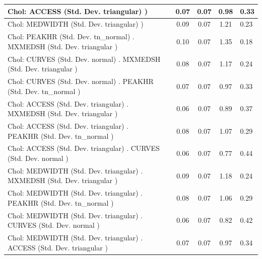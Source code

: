 \begin{table}
\begin{center}
\begin{tabular}{|l|l|c|c|c|l|}
			\hline
			 Chol: ACCESS (Std. Dev. triangular) ) &  & 0.07 & 0.07 & 0.98 & 0.33 \\
			\hline
			 Chol: MEDWIDTH (Std. Dev. triangular) ) &  & 0.09 & 0.07 & 1.21 & 0.23 \\
			\hline
			 Chol: PEAKHR (Std. Dev. tn_normal) . MXMEDSH (Std. Dev.   triangular ) &  & 0.10 & 0.07 & 1.35 & 0.18 \\
			\hline
			 Chol: CURVES (Std. Dev. normal) . MXMEDSH (Std. Dev.   triangular ) &  & 0.08 & 0.07 & 1.17 & 0.24 \\
			\hline
			 Chol: CURVES (Std. Dev. normal) . PEAKHR (Std. Dev.   tn_normal ) &  & 0.07 & 0.07 & 0.97 & 0.33 \\
			\hline
			 Chol: ACCESS (Std. Dev. triangular) . MXMEDSH (Std. Dev.   triangular ) &  & 0.06 & 0.07 & 0.89 & 0.37 \\
			\hline
			 Chol: ACCESS (Std. Dev. triangular) . PEAKHR (Std. Dev.   tn_normal ) &  & 0.08 & 0.07 & 1.07 & 0.29 \\
			\hline
			 Chol: ACCESS (Std. Dev. triangular) . CURVES (Std. Dev.   normal ) &  & 0.06 & 0.07 & 0.77 & 0.44 \\
			\hline
			 Chol: MEDWIDTH (Std. Dev. triangular) . MXMEDSH (Std. Dev.   triangular ) &  & 0.09 & 0.07 & 1.18 & 0.24 \\
			\hline
			 Chol: MEDWIDTH (Std. Dev. triangular) . PEAKHR (Std. Dev.   tn_normal ) &  & 0.08 & 0.07 & 1.06 & 0.29 \\
			\hline
			 Chol: MEDWIDTH (Std. Dev. triangular) . CURVES (Std. Dev.   normal ) &  & 0.06 & 0.07 & 0.82 & 0.42 \\
			\hline
			 Chol: MEDWIDTH (Std. Dev. triangular) . ACCESS (Std. Dev.   triangular ) &  & 0.07 & 0.07 & 0.97 & 0.34 \\
			\hline
		\end{tabular}
	\end{center}
\end{table}